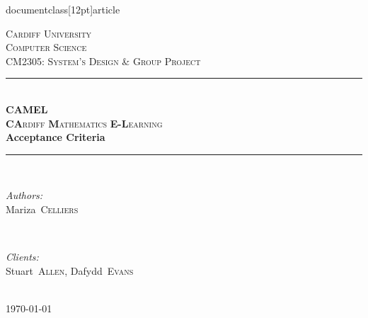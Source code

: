documentclass[12pt]{article}

\usepackage{geometry}
\geometry{a4paper}

\usepackage{url}

\linespread{1.2}

\setlength{\parindent}{0pt}
\setlength{\parskip}{1em}


	\begin{titlepage}
		\newcommand{\HRule}{\rule{\linewidth}{0.5mm}}

		\center

		\textsc{\LARGE Cardiff University}\\[1.5cm]
		\textsc{\Large Computer Science}\\[0.5cm]
		\textsc{\large CM2305: System's Design \& Group Project}\\[0.5cm]

		\HRule \\[0.4cm]
		\textsc{\Large \textbf{CAMEL}}\\[0.1cm]
		\textsc{\Large \textbf{CA}rdiff \textbf{M}athematics \textbf{E-L}earning}\\[0.7cm]
		{\huge\bfseries Acceptance Criteria}\\[0.4cm]
		\HRule \\[1.5cm]

		\begin{minipage}{0.4\textwidth}
			\begin{flushleft} \large
				\emph{Authors:}\\
				\mbox{Mariza \textsc{Celliers}}
			\end{flushleft}
		\end{minipage}
		~
		\begin{minipage}{0.4\textwidth}
			\begin{flushright} \large
				\emph{Clients:} \\
				\mbox{Stuart \textsc{Allen}}, \mbox{Dafydd \textsc{Evans}}
			\end{flushright}
		\end{minipage}\\[3cm]

		{\large \today}\\[2cm]

		\vfill
	\end{titlepage}


	\tableofcontents

	\newpage
